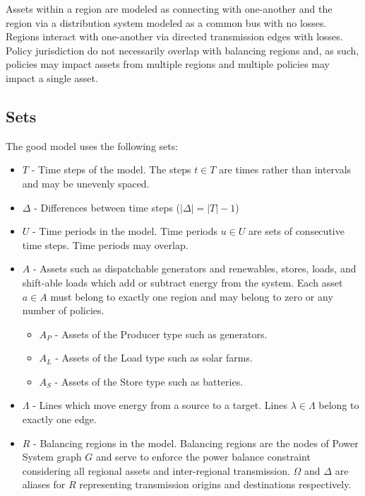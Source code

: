 Assets within a region are modeled as connecting with one-another and the region via a distribution system modeled as a common bus with no losses. Regions interact with one-another via directed transmission edges with losses. Policy jurisdiction do not necessarily overlap with balancing regions and, as such, policies may impact assets from multiple regions and multiple policies may impact a single asset.

\subsection{Sets}

The \gls{good} model uses the following sets:

\begin{itemize}
	\item $T$ - Time steps of the model. The steps $t \in T$ are times rather than intervals and may be unevenly spaced.
		\item $\Delta$ - Differences between time steps ($|\Delta| = |T| - 1$)
	\item $U$ - Time periods in the model. Time periods $u \in U$ are sets of consecutive time steps. Time periods may overlap.
	\item $A$ - Assets such as dispatchable generators and renewables, stores, loads, and shift-able loads which add or subtract energy from the system. Each asset $a \in A$ must belong to exactly one region and may belong to zero or any number of policies.
	\begin{itemize}
		\item $A_P$ - Assets of the Producer type such as generators.
		\item $A_L$ - Assets of the Load type such as solar farms.
		\item $A_S$ - Assets of the Store type such as batteries.
	\end{itemize}
	\item $\Lambda$ - Lines which move energy from a source to a target. Lines $\lambda \in \Lambda$ belong to exactly one edge.
	\item $R$ - Balancing regions in the model. Balancing regions are the nodes of Power System graph $G$ and serve to enforce the power balance constraint considering all regional assets and inter-regional transmission. $\Omega$ and $\Delta$ are aliases for $R$ representing transmission origins and destinations respectively.

\end{itemize}
